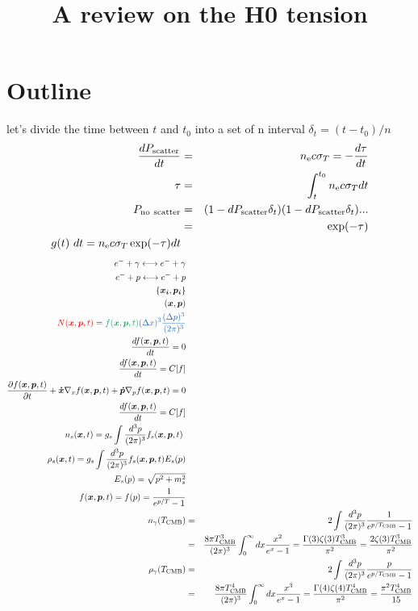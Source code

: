 \documentclass[a4paper, 11pt]{article}
\def\ba{\begin{eqnarray}}
\def\ea{\end{eqnarray}}
\newcommand{\red}[1]{{\color{red}#1}}
\newcommand{\green}[1]{{\color{ForestGreen}#1}}
\newcommand{\blue}[1]{{\color{denim}#1}}
\begin{document}
\title{A review on the H0 tension}
\maketitle

\section{Outline}

let's divide the time between $t$ and $t_{0}$ into a set of n interval $\delta_{t}= (t-t_{0})/n$
\ba
\frac{dP_{\rm scatter}}{dt} &=&  n_{\rm e} c \sigma_{T}  = - \frac{d \tau}{d t}\\
\tau &=& \int^{t_0}_{t}  n_{\rm e} c \sigma_{T} dt  \\
P_{\rm no \ scatter} &=& (1- dP_{\rm scatter}\delta_{t})(1- dP_{\rm scatter}\delta_{t})... \\
&=& \exp(- \tau) \\
g(t) dt =  n_{\rm e} c \sigma_{T}   \exp(- \tau)  dt 
\ea
\ba
e^{-} + \gamma \longleftrightarrow e^{-} + \gamma \\
e^{-} + p \longleftrightarrow e^{-} + p \\
\{\bm{x_{i}}, \bm{p_{i}} \} \\
(\bm{x}, \bm{p})  \\
\red{N(\bm{x}, \bm{p}, t) }= \green{f(\bm{x}, \bm{p}, t)}\blue{ (\Delta x)^{3} \frac{(\Delta p)^{3} }{(2\pi)^{3}}} \\
\frac{df(\bm{x}, \bm{p}, t)}{dt}=0 \\
\frac{df(\bm{x}, \bm{p}, t)}{dt}=C[f] \\
\frac{\partial f(\bm{x}, \bm{p}, t)}{ \partial t} + \bm{\dot{x}}\nabla_{x}f(\bm{x}, \bm{p}, t) + \bm{\dot{p}}\nabla_{p}f(\bm{x}, \bm{p}, t) = 0 \\
\frac{df(\bm{x}, \bm{p}, t)}{dt}= C[f] \\
n_{s} (\bm{x},t) = g_{s}\int \frac{d^{3}p}{(2\pi)^{3}} f_{s}(\bm{x}, \bm{p}, t)  \\
\rho_{s}(\bm{x},t) = g_{s}\int \frac{d^{3}p}{(2\pi)^{3}} f_{s}(\bm{x}, \bm{p}, t) E_{s}(p) \\
E_{s}(p)= \sqrt{p^{2} + m^{2}_{s}} \\
f(\bm{x}, \bm{p}, t) = f(p) = \frac{1}{e^{p/T}-1} \\
n_{\gamma}(T_{\rm CMB}) &=& 2 \int \frac{d^{3}p}{(2\pi)^{3}} \frac{1}{e^{p/T_{\rm CMB}}-1} \nonumber  \\
&=& \frac{8\pi T_{\rm CMB}^{3}}{(2\pi)^{3}} \int^{\infty}_{0} dx \frac{x^{2}}{e^{x}-1} =  \frac{\Gamma(3)\zeta(3) T_{\rm CMB}^{3}}{\pi^{2}} = \frac{2\zeta(3) T_{\rm CMB}^{3}}{\pi^{2}} \nonumber \\
\rho_{\gamma}(T_{\rm CMB}) &=& 2 \int \frac{d^{3}p}{(2\pi)^{3}} \frac{p}{e^{p/T_{\rm CMB}}-1} \nonumber  \\
&=& \frac{8\pi T_{\rm CMB}^{4}}{(2\pi)^{3}} \int^{\infty}_{0} dx \frac{x^{3}}{e^{x}-1}=  \frac{\Gamma(4)\zeta(4) T_{\rm CMB}^{4}}{\pi^{2}} = \frac{ \pi^{2}T_{\rm CMB}^{4}}{15}  \nonumber
\ea
\end{document}
